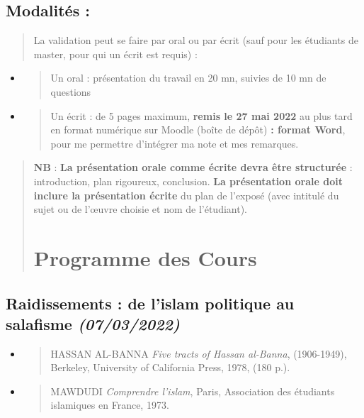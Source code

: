 \hypertarget{modalituxe9s}{%
\subsection{Modalités :}\label{modalituxe9s}}

\begin{quote}
La validation peut se faire par oral ou par écrit (sauf pour les
étudiants de master, pour qui un écrit est requis) :
\end{quote}

\begin{itemize}
\item
  \begin{quote}
  Un oral : présentation du travail en 20 mn, suivies de 10 mn de
  questions
  \end{quote}
\item
  \begin{quote}
  Un écrit : de 5 pages maximum, \textbf{remis le 27 mai 2022} au plus
  tard en format numérique sur Moodle (boîte de dépôt) \textbf{: format
  Word}, pour me permettre d'intégrer ma note et mes remarques.
  \end{quote}
\end{itemize}

\begin{quote}
\textbf{NB} : \textbf{La présentation orale comme écrite devra être
structurée} : introduction, plan rigoureux, conclusion. \textbf{La
présentation orale doit inclure la présentation écrite} du plan de
l'exposé (avec intitulé du sujet ou de l'œuvre choisie et nom de
l'étudiant).

\section{Programme des Cours}
\end{quote}
\hypertarget{raidissements-de-lislam-politique-au-salafisme-07032022}{%
\subsection{\texorpdfstring{{Raidissements : de l'islam
politique au salafisme}
\emph{(07/03/2022)}}{Raidissements : de l'islam politique au salafisme (07/03/2022)}}\label{raidissements-de-lislam-politique-au-salafisme-07032022}}

\begin{itemize}
\item
  \begin{quote}
  HASSAN AL-BANNA \emph{Five tracts of Hassan al-Banna}, (1906-1949),
  Berkeley, University of California Press, 1978, (180 p.).
  \end{quote}
\item
  \begin{quote}
  MAWDUDI \emph{Comprendre l'islam}, Paris, Association des étudiants
  islamiques en France, 1973.
  \end{quote}
\end{itemize}

